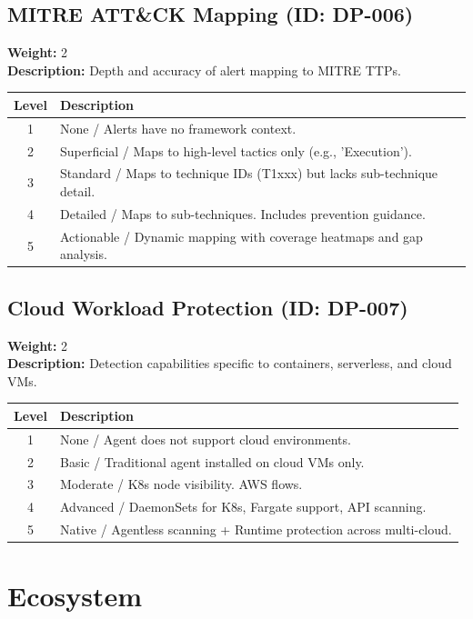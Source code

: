 \documentclass{article}
\begin{document}
\subsection{MITRE ATT\&CK Mapping (ID: DP-006)}
\textbf{Weight:} 2 \\
\textbf{Description:} Depth and accuracy of alert mapping to MITRE TTPs.
\vspace{0.3cm}
\begin{longtable}{|c|p{12cm}|}
\hline
\rowcolor{lightgray} \textbf{Level} & \textbf{Description} \\ \hline
1 & None / Alerts have no framework context. \\ \hline
2 & Superficial / Maps to high-level tactics only (e.g., 'Execution'). \\ \hline
3 & Standard / Maps to technique IDs (T1xxx) but lacks sub-technique detail. \\ \hline
4 & Detailed / Maps to sub-techniques. Includes prevention guidance. \\ \hline
5 & Actionable / Dynamic mapping with coverage heatmaps and gap analysis. \\ \hline
\end{longtable}
\vspace{0.5cm}
\subsection{Cloud Workload Protection (ID: DP-007)}
\textbf{Weight:} 2 \\
\textbf{Description:} Detection capabilities specific to containers, serverless, and cloud VMs.
\vspace{0.3cm}
\begin{longtable}{|c|p{12cm}|}
\hline
\rowcolor{lightgray} \textbf{Level} & \textbf{Description} \\ \hline
1 & None / Agent does not support cloud environments. \\ \hline
2 & Basic / Traditional agent installed on cloud VMs only. \\ \hline
3 & Moderate / K8s node visibility. AWS flows. \\ \hline
4 & Advanced / DaemonSets for K8s, Fargate support, API scanning. \\ \hline
5 & Native / Agentless scanning + Runtime protection across multi-cloud. \\ \hline
\end{longtable}
\vspace{0.5cm}
\section{Ecosystem}
\end{document}
